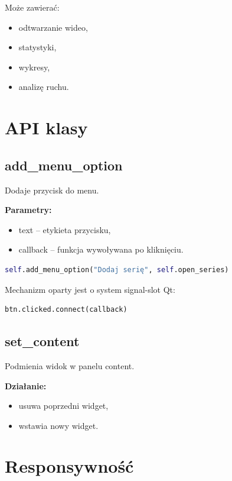 \documentclass[11pt]{article}
\begin{document}
Może zawierać:
\begin{itemize}
    \item odtwarzanie wideo,
    \item statystyki,
    \item wykresy,
    \item analizę ruchu.
\end{itemize}

\section{API klasy}

\subsection{add\_menu\_option}

Dodaje przycisk do menu.

\textbf{Parametry:}
\begin{itemize}
    \item text -- etykieta przycisku,
    \item callback -- funkcja wywoływana po kliknięciu.
\end{itemize}

\begin{lstlisting}[language=Python]
self.add_menu_option("Dodaj serię", self.open_series)
\end{lstlisting}

Mechanizm oparty jest o system signal-slot Qt:

\begin{lstlisting}[language=Python]
btn.clicked.connect(callback)
\end{lstlisting}

\subsection{set\_content}

Podmienia widok w panelu content.

\textbf{Działanie:}
\begin{itemize}
    \item usuwa poprzedni widget,
    \item wstawia nowy widget.
\end{itemize}

\section{Responsywność}
\end{document}
